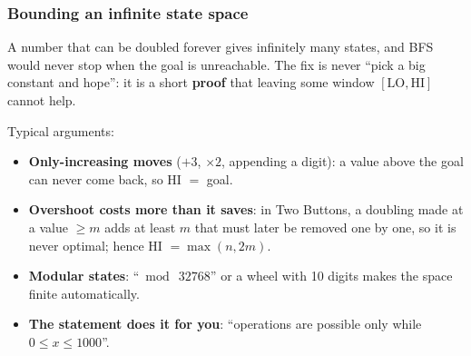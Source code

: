 \subsubsection*{Bounding an infinite state space}

A number that can be doubled forever gives infinitely many states, and BFS would never stop when the goal is unreachable. The fix is never ``pick a big constant and hope'': it is a short \textbf{proof} that leaving some window $[\mathrm{LO}, \mathrm{HI}]$ cannot help.

\begin{diagrambox}
\end{diagrambox}

Typical arguments:
\begin{itemize}[leftmargin=*]
    \item \textbf{Only-increasing moves} ($+3$, $\times2$, appending a digit): a value above the goal can never come back, so HI $=$ goal.
    \item \textbf{Overshoot costs more than it saves}: in Two Buttons, a doubling made at a value $\ge m$ adds at least $m$ that must later be removed one by one, so it is never optimal; hence HI $= \max(n, 2m)$.
    \item \textbf{Modular states}: ``$\bmod\ 32768$'' or a wheel with 10 digits makes the space finite automatically.
    \item \textbf{The statement does it for you}: ``operations are possible only while $0\le x\le 1000$''.
\end{itemize}

